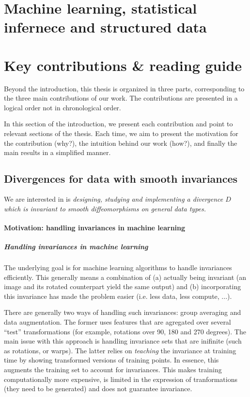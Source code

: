 
\section{Machine learning, statistical infernece and structured data}


\section{Key contributions \& reading guide}

Beyond the introduction, this thesis is organized in three parts, corresponding to the three main contributions of our work. The contributions are presented in a logical order not in chronological order.

In this section of the introduction, we present each contribution and point to relevant sections of the thesis. Each time, we aim to present the motivation for the contribution (why?), the intuition behind our work (how?), and finally the main results in a simplified manner.

\newpage
\subsection{Divergences for data with smooth invariances}

We are interested in is \emph{designing, studying and implementing a divergence $D$ which is invariant to smooth diffeomorphisms on general data types.}

\paragraph{Motivation: handling invariances in machine learning}

\subparagraph{Handling invariances in machine learning}
The underlying goal is for machine learning algorithms to handle invariances efficiently. This generally means a combination of (a) actually being invariant (an image and its rotated counterpart yield the same output) and (b) incorporating this invariance has made the problem easier (i.e. less data, less compute, ...).

There are generally two ways of handling such invariances: group averaging and data augmentation. The former uses features that are agregated over several ``test'' transformations (for example, rotations over 90, 180 and 270 degrees). The main issue with this approach is handling invariance sets that are inifinite (such as rotations, or warps). The latter relies on \emph{teaching} the invariance at training time by showing transformed versions of training points. In essence, this augments the training set to account for invariances. This makes training computationally more expensive, is limited in the expression of tranformations (they need to be generated) and does not guarantee invariance.

